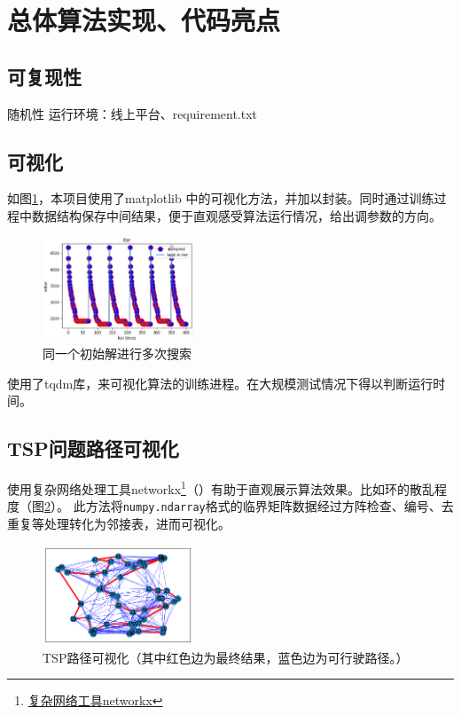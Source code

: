\documentclass[lang=cn,11pt]{elegantpaper}
\begin{document}
\section{总体算法实现、代码亮点}
\subsection{可复现性}
随机性
运行环境：线上平台、requirement.txt

\subsection{可视化}
如图\ref{img:同随机数种子}，本项目使用了matplotlib 中的可视化方法，并加以封装。同时通过训练过程中数据结构保存中间结果，便于直观感受算法运行情况，给出调参数的方向。
\begin{figure}[ht]
  \centering
  \includegraphics[width=0.4\textwidth]{figure/同随机数种子、同初始解多次运行结果.png} %
  \caption{同一个初始解进行多次搜索} %
  \label{img:同随机数种子} %
\end{figure}

使用了tqdm库，来可视化算法的训练进程。在大规模测试情况下得以判断运行时间。

\subsection{TSP问题路径可视化}
使用复杂网络处理工具networkx\footnote{\href{https://networkx.org/documentation/stable/auto_examples/index.html}{复杂网络工具networkx}}（\cite{NetworkXpaper}）有助于直观展示算法效果。比如环的散乱程度（图\ref{img:TSP路径可视化}）。
此方法将\lstinline{numpy.ndarray}格式的临界矩阵数据经过方阵检查、编号、去重复等处理转化为邻接表，进而可视化。


\begin{figure}[ht]
  \centering
  \includegraphics[width=0.4\textwidth]{figure/TSP路径可视化.png} %
  \caption{TSP路径可视化（其中红色边为最终结果，蓝色边为可行驶路径。）} %
  \label{img:TSP路径可视化} %
\end{figure}
\end{document}
